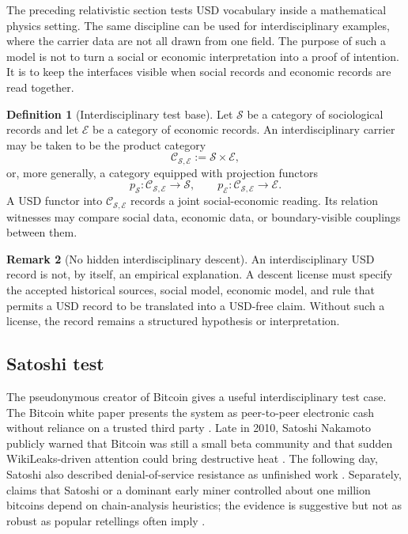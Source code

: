 \documentclass[11pt]{article}
\newcommand{\defeq}{\mathrel{:=}}
\theoremstyle{definition}
\newtheorem{definition}{Definition}[section]
\newtheorem{remark}[definition]{Remark}
\theoremstyle{plain}
\begin{document}
The preceding relativistic section tests USD vocabulary inside a
mathematical physics setting.  The same discipline can be used for
interdisciplinary examples, where the carrier data are not all drawn from
one field.  The purpose of such a model is not to turn a social or
economic interpretation into a proof of intention.  It is to keep the
interfaces visible when social records and economic records are read
together.

\begin{definition}[Interdisciplinary test base]
Let $\mathcal S$ be a category of sociological records and let
$\mathcal E$ be a category of economic records.  An interdisciplinary
carrier may be taken to be the product category
\[
  \mathcal C_{\mathcal S,\mathcal E}
  \defeq
  \mathcal S\times\mathcal E,
\]
or, more generally, a category equipped with projection functors
\[
  p_{\mathcal S}:\mathcal C_{\mathcal S,\mathcal E}\to\mathcal S,
  \qquad
  p_{\mathcal E}:\mathcal C_{\mathcal S,\mathcal E}\to\mathcal E.
\]
A USD functor into $\mathcal C_{\mathcal S,\mathcal E}$ records a
joint social-economic reading.  Its relation witnesses may compare
social data, economic data, or boundary-visible couplings between them.
\end{definition}

\begin{remark}[No hidden interdisciplinary descent]
An interdisciplinary USD record is not, by itself, an empirical
explanation.  A descent license must specify the accepted historical
sources, social model, economic model, and rule that permits a USD record
to be translated into a USD-free claim.  Without such a license, the
record remains a structured hypothesis or interpretation.
\end{remark}

\subsection{Satoshi test}

The pseudonymous creator of Bitcoin gives a useful interdisciplinary
test case.  The Bitcoin white paper presents the system as peer-to-peer
electronic cash without reliance on a trusted third party
\cite{Nakamoto2008}.  Late in 2010, Satoshi Nakamoto publicly warned that
Bitcoin was still a small beta community and that sudden WikiLeaks-driven
attention could bring destructive heat \cite{Nakamoto2010WikiLeaks}.
The following day, Satoshi also described denial-of-service resistance as
unfinished work \cite{Nakamoto2010DoS}.  Separately, claims that Satoshi
or a dominant early miner controlled about one million bitcoins depend on
chain-analysis heuristics; the evidence is suggestive but not as robust
as popular retellings often imply \cite{BitMEX2018}.
\end{document}
